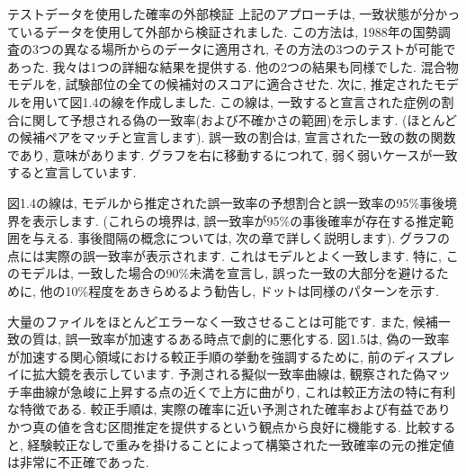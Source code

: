 \documentclass[10pt,dvipdfmx,a4]{beamer}
\begin{document}

\begin{frame}{テストデータを使用した確率の外部検証}
上記のアプローチは, 一致状態が分かっているデータを使用して外部から検証されました.
この方法は, 1988年の国勢調査の3つの異なる場所からのデータに適用され, その方法の3つのテストが可能であった.
我々は1つの詳細な結果を提供する.
他の2つの結果も同様でした.
混合物モデルを, 試験部位の全ての候補対のスコアに適合させた.
次に, 推定されたモデルを用いて図1.4の線を作成しました.
この線は, 一致すると宣言された症例の割合に関して予想される偽の一致率(および不確かさの範囲)を示します.
(ほとんどの候補ペアをマッチと宣言します).
誤一致の割合は, 宣言された一致の数の関数であり, 意味があります.
グラフを右に移動するにつれて, 弱く弱いケースが一致すると宣言しています.

図1.4の線は, モデルから推定された誤一致率の予想割合と誤一致率の95\%事後境界を表示します.
(これらの境界は, 誤一致率が95\%の事後確率が存在する推定範囲を与える.
事後間隔の概念については, 次の章で詳しく説明します).
グラフの点には実際の誤一致率が表示されます.
これはモデルとよく一致します.
特に, このモデルは, 一致した場合の90\%未満を宣言し, 誤った一致の大部分を避けるために, 他の10\%程度をあきらめるよう勧告し, ドットは同様のパターンを示す.
\end{frame}


\begin{frame}
大量のファイルをほとんどエラーなく一致させることは可能です.
また, 候補一致の質は, 誤一致率が加速するある時点で劇的に悪化する.
図1.5は, 偽の一致率が加速する関心領域における較正手順の挙動を強調するために, 前のディスプレイに拡大鏡を表示しています.
予測される擬似一致率曲線は, 観察された偽マッチ率曲線が急峻に上昇する点の近くで上方に曲がり, これは較正方法の特に有利な特徴である.
較正手順は, 実際の確率に近い予測された確率および有益でありかつ真の値を含む区間推定を提供するという観点から良好に機能する.
比較すると, 経験較正なしで重みを掛けることによって構築された一致確率の元の推定値は非常に不正確であった.
\end{frame}

\end{document}
